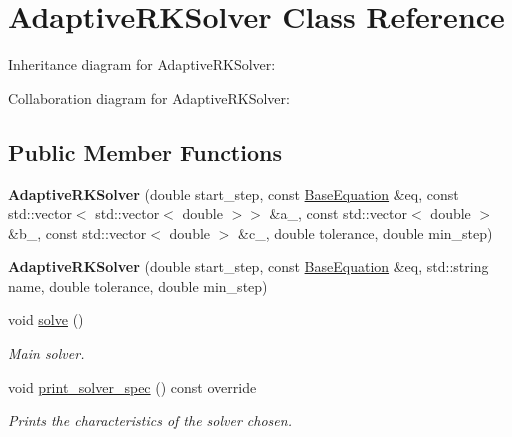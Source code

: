 \hypertarget{classAdaptiveRKSolver}{}\section{Adaptive\+R\+K\+Solver Class Reference}
\label{classAdaptiveRKSolver}


Inheritance diagram for Adaptive\+R\+K\+Solver\+:


Collaboration diagram for Adaptive\+R\+K\+Solver\+:
\subsection*{Public Member Functions}
\begin{DoxyCompactItemize}
\item 
\mbox{\label{classAdaptiveRKSolver_af3fd0e899dbda2be0ff705f8d8ea7a08}} 
{\bfseries Adaptive\+R\+K\+Solver} (double start\+\_\+step, const \hyperlink{classBaseEquation}{Base\+Equation} \&eq, const std\+::vector$<$ std\+::vector$<$ double $>$$>$ \&a\+\_\+, const std\+::vector$<$ double $>$ \&b\+\_\+, const std\+::vector$<$ double $>$ \&c\+\_\+, double tolerance, double min\+\_\+step)
\item 
\mbox{\label{classAdaptiveRKSolver_a6d3aa9cd741ce79167448dfb405f9ff2}} 
{\bfseries Adaptive\+R\+K\+Solver} (double start\+\_\+step, const \hyperlink{classBaseEquation}{Base\+Equation} \&eq, std\+::string name, double tolerance, double min\+\_\+step)
\item 
\mbox{\label{classAdaptiveRKSolver_ad4178bf295f9101b27ca96a92deb8c3e}} 
void \hyperlink{classAdaptiveRKSolver_ad4178bf295f9101b27ca96a92deb8c3e}{solve} ()
\begin{DoxyCompactList}\small\item\em Main solver. \end{DoxyCompactList}\item 
\mbox{\label{classAdaptiveRKSolver_aba981c5c2b0816506bc3a2e1c21d5bc9}} 
void \hyperlink{classAdaptiveRKSolver_aba981c5c2b0816506bc3a2e1c21d5bc9}{print\+\_\+solver\+\_\+spec} () const override
\begin{DoxyCompactList}\small\item\em Prints the characteristics of the solver chosen. \end{DoxyCompactList}\end{DoxyCompactItemize}
